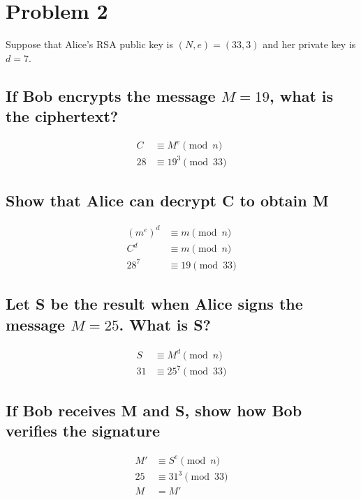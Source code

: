 \documentclass{article}
\newenvironment{problem}[1]{
  \nobreak\section*{Problem #1}
}{}
\begin{document}
  \break

  \begin{problem}{2}
  Suppose that Alice’s RSA public key is $(N,e) = (33,3)$ and her 
  private key is $d=7$.

  \subsection*{If Bob encrypts the message $M = 19$, what is the ciphertext?}
  \begin{center}
    \begin{equation*}
      \begin{split}
        C & \equiv M^{e} \pmod{n}\\
        28 & \equiv 19^{3} \pmod{33}
      \end{split}
    \end{equation*}
  \end{center}

  \subsection*{Show that Alice can decrypt C to obtain M}
  \begin{center}
    \begin{equation*}
      \begin{split}
        (m^e)^d & \equiv m \pmod{n}\\
        C^d & \equiv m \pmod{n}\\
        28^7 & \equiv 19 \pmod{33}
      \end{split}
    \end{equation*}
  \end{center}

  \subsection*{Let S be the result when Alice signs the message $M=25$. What is S?}
  \begin{center}
    \begin{equation*}
      \begin{split}
        S & \equiv M^d \pmod{n}\\
        31 & \equiv 25^7 \pmod{33}
      \end{split}
    \end{equation*}
  \end{center}

  \subsection*{If Bob receives M and S, show how Bob verifies the signature}
  \begin{center}
    \begin{equation*}
      \begin{split}
        M' & \equiv S^e \pmod{n}\\
        25 & \equiv 31^3 \pmod{33}\\
        M & = M'
      \end{split}
    \end{equation*}
  \end{center}
  \end{problem}
\end{document}
